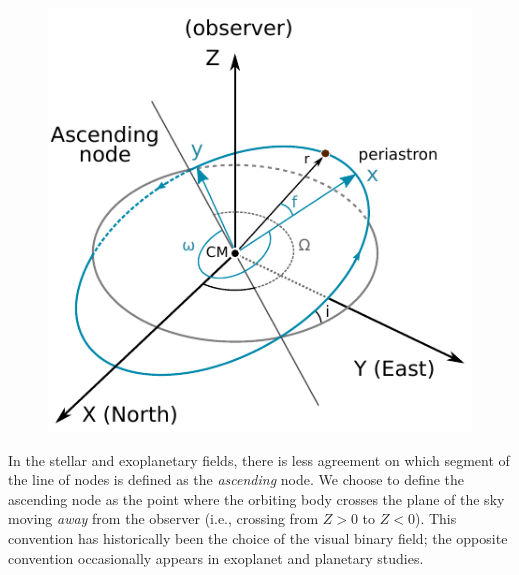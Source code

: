 \documentclass[modern]{aastex62}
\begin{document}
\begin{figure}[htbp]
  \begin{centering}
  \includegraphics{figures/orbit3D.pdf}
  \end{centering}
\end{figure}

In the stellar and exoplanetary fields, there is less agreement on which  segment of the line of nodes is defined as the \emph{ascending} node. We choose to define the ascending node as the point where the orbiting body crosses the plane of the sky moving \emph{away} from the observer (i.e., crossing from $Z > 0$ to $Z< 0$). This convention has historically been the choice of the visual binary field; the opposite convention occasionally appears in exoplanet and planetary studies.
\end{document}

